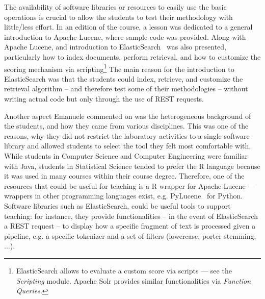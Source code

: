The availability of software libraries or resources to easily use the basic operations is crucial to allow the students to test their methodology with little/less effort. In an edition of the course, a lesson was dedicated to a general introduction to Apache Lucene, where sample code was  provided. Along with Apache Lucene, and introduction to ElasticSearch~\cite{elasticsearch} was also presented, particularly how to index documents, perform retrieval, and how to customize the scoring mechanism via scripting\footnote{\scriptsize{ElasticSearch allows to evaluate a custom score via scripts --- see the {\em Scripting} module. Apache Solr provides similar functionalities via {\em Function Queries}.}} The main reason for the introduction to ElasticSearch was that the students could index, retrieve, and customize the retrieval algorithm -- and therefore test some of their methodologies -- without writing actual code but only through the use of REST requests.

Another aspect Emanuele commented on was the heterogeneous background of the students, and how they came from various disciplines. This was one of the reasons, why they did not restrict the laboratory activities to a single software library and  allowed students to select the tool they felt most comfortable with. While students in Computer Science and Computer Engineering were familiar with Java, students in Statistical Science tended to prefer the R language because it was used in many courses within their course degree. Therefore, one of the resources that could be useful for teaching is a R wrapper for Apache Lucene --- wrappers in other programming languages exist, e.g. PyLucene~\cite{PyLucene} for Python. Software libraries such as ElasticSearch, could be useful tools to support teaching: for instance, they provide functionalities -- in the event of ElasticSearch a REST request -- to display how a specific fragment of text is processed given a pipeline, e.g. a specific tokenizer and a set of filters (lowercase, porter stemming, $\dots$).
